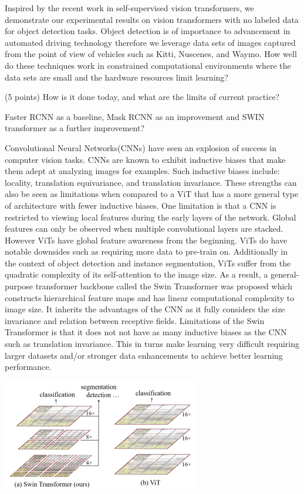 \documentclass[10pt,twocolumn,letterpaper]{article}
\begin{document}
Inspired by the recent work in self-supervised vision transformers\cite{caron2021emerging}, we demonstrate our experimental results on vision transformers with no labeled data for object detection tasks. Object detection is of importance to advancement in automated driving technology therefore we leverage data sets of images captured from the point of view of vehicles such as Kitti\cite{Geiger2012CVPR}, Nuscenes\cite{nuscenes2019}, and Waymo. How well do these techniques work in constrained computational environments where the data sets are small and the hardware resources limit learning?

(5 points) How is it done today, and what are the limits of current practice?

Faster RCNN as a baseline, Mask RCNN as an improvement and SWIN transformer as a further improvement? 

Convolutional Neural Networks(CNNs) have seen an explosion of success in computer vision tasks. CNNs are known to exhibit inductive biases that make them adept at analyzing images for examples. Such inductive biases include: locality, translation equivariance, and translation invariance. These strengths can also be seen as limitations when compared to a ViT that has a more general type of architecture with fewer inductive biases. One limitation is that a CNN is restricted to viewing local features during the early layers of the network. Global features can only be observed when multiple convolutional layers are stacked. However ViTs have global feature awareness from the beginning. ViTs do have notable downsides such as requiring more data to pre-train on.  Additionally in the context of object detection and instance segmentation, ViTs suffer from the quadratic complexity of its self-attention to the image size. As a result, a general-purpose transformer backbone called the Swin Transformer\cite{liu2021swin} was proposed which constructs hierarchical feature maps and has linear computational complexity to image size. It inherits the advantages of the CNN as it fully considers the size invariance and relation between receptive fields. Limitations of the Swin Transformer is that it does not not have as many inductive biases as the CNN such as translation invariance. This in turns make learning very difficult requiring larger datasets and/or stronger data enhancements to achieve better learning performance.

\includegraphics[width=0.8\linewidth]{docs/latex/images/SwinVsViT.png}
\caption{}
\end{document}
